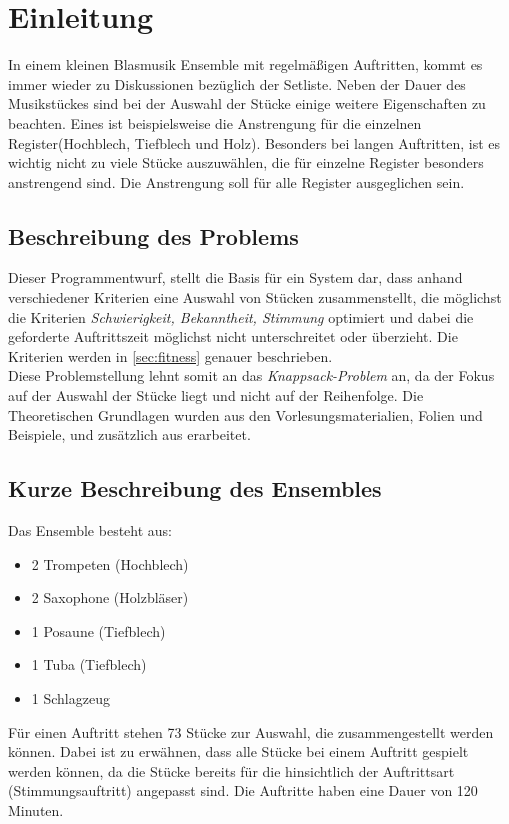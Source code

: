 \section{Einleitung}\label{sec:einleitung}
In einem kleinen Blasmusik Ensemble mit regelmäßigen Auftritten, kommt es immer wieder zu Diskussionen 
bezüglich der Setliste. Neben der Dauer des Musikstückes sind bei der Auswahl der Stücke einige 
weitere Eigenschaften zu beachten. Eines ist beispielsweise die Anstrengung für die einzelnen Register(Hochblech, Tiefblech und Holz). 
Besonders bei langen Auftritten, ist es wichtig nicht zu viele Stücke auszuwählen, die 
für einzelne Register besonders anstrengend sind. Die Anstrengung soll für alle Register ausgeglichen sein.
\subsection{Beschreibung des Problems}
 Dieser Programmentwurf, stellt die Basis für ein System dar, dass anhand verschiedener Kriterien eine 
 Auswahl von Stücken zusammenstellt, die möglichst die Kriterien \emph{Schwierigkeit, Bekanntheit, Stimmung} optimiert und dabei die 
 geforderte Auftrittszeit möglichst nicht unterschreitet oder überzieht. Die Kriterien werden in \autoref{sec:fitness} genauer 
 beschrieben.\\
 Diese Problemstellung lehnt somit an das \textit{Knappsack-Problem} an, 
 da der Fokus auf der Auswahl der Stücke liegt und nicht auf der Reihenfolge.
 Die Theoretischen Grundlagen wurden aus den Vorlesungsmaterialien, Folien und Beispiele, und zusätzlich
aus \cite{keller:2000} erarbeitet.
\subsection{Kurze Beschreibung des Ensembles}
Das Ensemble besteht aus: 
\begin{itemize}
    \item 2 Trompeten (Hochblech)
    \item 2 Saxophone (Holzbläser)
    \item 1 Posaune (Tiefblech)
    \item 1 Tuba (Tiefblech)
    \item 1 Schlagzeug 
\end{itemize} 

Für einen Auftritt stehen 73 Stücke zur Auswahl, die zusammengestellt werden können. Dabei ist zu erwähnen, dass alle Stücke bei einem Auftritt gespielt werden können, 
da die Stücke bereits für die hinsichtlich der Auftrittsart (Stimmungsauftritt) angepasst sind. 
Die Auftritte haben eine Dauer von 120 Minuten.